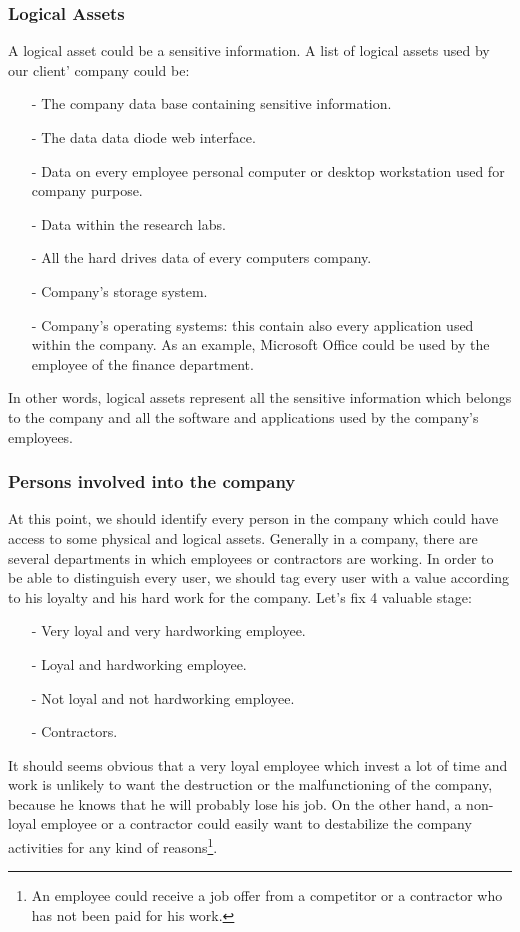 \documentclass[a4paper,10pt]{article}
\begin{document}
\subsubsection{Logical Assets}
A logical asset could be a sensitive information. A list of logical assets used by our client' company could be:
\begin{enumerate}
\item[-] The company data base containing sensitive information.
\item[-] The data data diode web interface.
\item[-] Data on every employee personal computer or desktop workstation used for company purpose.
\item[-] Data within the research labs.
\item[-] All the hard drives data of every computers company. 
\item[-] Company's storage system.
\item[-] Company's operating systems: this contain also every application used within the company. As an example, Microsoft Office could be used by the employee of the finance department.
\end{enumerate}
In other words, logical assets represent all the sensitive information which belongs to the company and all the software and applications used by the company's employees.

\subsubsection{Persons involved into the company}
At this point, we should identify every person in the company which could have access to some physical and logical assets. Generally in a company, there are several departments in which employees or contractors are working. In order to be able to distinguish every user, we should tag every user with a value according to his loyalty and his hard work for the company. Let's fix 4 valuable stage:
\begin{enumerate}
\item[-] Very loyal and very hardworking employee.
\item[-] Loyal and hardworking employee.
\item[-] Not loyal and not hardworking employee.
\item[-] Contractors.
\end{enumerate}
It should seems obvious that a very loyal employee which invest a lot of time and work is unlikely to want the destruction or the malfunctioning of the company, because he knows that he will probably lose his job. On the other hand, a non-loyal employee or a contractor could easily want to destabilize the company activities for any kind of reasons\footnote{An employee could receive a job offer from a competitor or a contractor who has not been paid for his work.}.
\end{document}
